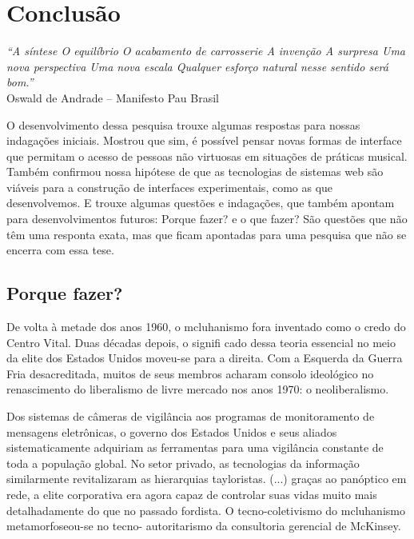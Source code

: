 
\chapter{Conclusão}
\label{ch:conclusao}
\begin{flushright}
        \textit{``A síntese
O equilíbrio
O acabamento de carrosserie
A invenção
A surpresa
Uma nova perspectiva
Uma nova escala
Qualquer esforço natural nesse sentido será bom.''} \\
Oswald de Andrade – Manifesto Pau Brasil    
\end{flushright}

O desenvolvimento dessa pesquisa trouxe algumas respostas para nossas indagações iniciais. Mostrou que sim, é possível pensar novas formas de interface que permitam o acesso de pessoas não virtuosas em situações de práticas musical. Também confirmou nossa hipótese de que as tecnologias de sistemas web são viáveis para a construção de interfaces experimentais, como as que desenvolvemos. E trouxe algumas questões e indagações, que também apontam para desenvolvimentos futuros: Porque fazer? e o que fazer? São questões que não têm uma responta exata, mas que ficam apontadas para uma pesquisa que não se encerra com essa tese.


\section{Porque fazer?}
\begin{citacao}
De volta à metade dos anos 1960, o mcluhanismo fora inventado
como o credo do Centro Vital. Duas décadas depois, o signifi cado dessa teoria essencial no meio da elite dos Estados Unidos moveu-se para a direita. Com a Esquerda da Guerra Fria desacreditada, muitos de seus membros acharam consolo ideológico no renascimento do liberalismo de livre mercado nos anos 1970: o neoliberalismo.\cite[347]{Barbrook2009}
\end{citacao}

\begin{citacao}
Dos sistemas de câmeras de vigilância aos programas de monitoramento de mensagens eletrônicas, o governo dos Estados Unidos e seus aliados sistematicamente adquiriam as ferramentas para uma vigilância constante de toda a população global. No setor privado, as tecnologias da informação similarmente revitalizaram as hierarquias tayloristas. (...) graças ao panóptico em rede, a elite corporativa era agora capaz de controlar suas vidas muito mais detalhadamente do que no passado fordista. O tecno-coletivismo do mcluhanismo metamorfoseou-se no tecno- autoritarismo da consultoria gerencial de McKinsey. \cite[345]{Barbrook2009}
\end{citacao}

